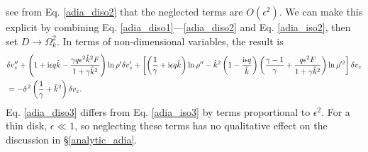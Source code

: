 see from Eq. \ref{adia_diso2} that the neglected terms are
$O(\epsilon^2)$. We can make this explicit by combining
Eq. \ref{adia_diso1}---\ref{adia_diso2} and Eq. \ref{adia_iso2}, then
set $D\to\Omega_k^2$. In terms of non-dimensional variables, the result
is  
\begin{align}
   &\delta v_z ^{\prime\prime} + \left(1 + \mathrm{i}\epsilon q\hat{k} -
    \frac{\gamma q \epsilon^2\hat{k}^2F}{1+\gamma
      \hat{k}^2}\right)\ln\rho^{\prime}\delta v_z^\prime +
  \left[\left(\frac{1}{\gamma} + \mathrm{i} \epsilon q
      \hat{k}\right)\ln\rho^{\prime\prime} - \hat{k}^2\left(1 -
      \frac{\mathrm{i}\epsilon
        q}{\hat{k}}\right)\left(\frac{\gamma-1}{\gamma} +
      \frac{q\epsilon^2F}{1+\gamma\hat{k}^2}\right)\ln\rho^{\prime
      2}\right]\delta v_z \notag\\&=
  -\hat{\sigma}^2\left(\frac{1}{\gamma} + \hat{k}^2\right)\delta v_z\label{adia_diso3}.
\end{align}   
Eq. \ref{adia_diso3} differs from Eq. \ref{adia_iso3} by terms
proportional to $\epsilon^2$. For a thin disk, $\epsilon\ll1$, so
neglecting these terms has no qualitative effect on the discussion in
\S\ref{analytic_adia}. 